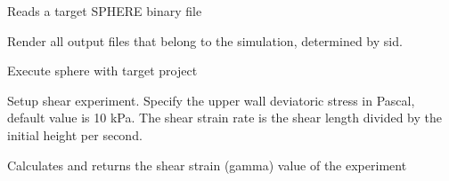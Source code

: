 \documentclass[letterpaper,10pt,english]{sphinxmanual}
\begin{document}
\begin{fulllineitems}

\begin{fulllineitems}
\label{python_api:sphere.Spherebin.readbin}
Reads a target SPHERE binary file

\end{fulllineitems}


\begin{fulllineitems}
\label{python_api:sphere.Spherebin.render}
Render all output files that belong to the simulation, determined by sid.

\end{fulllineitems}


\begin{fulllineitems}
\label{python_api:sphere.Spherebin.run}
Execute sphere with target project

\end{fulllineitems}


\begin{fulllineitems}
\label{python_api:sphere.Spherebin.shear}
Setup shear experiment. Specify the upper wall 
deviatoric stress in Pascal, default value is 10 kPa.
The shear strain rate is the shear length divided by the
initial height per second.

\end{fulllineitems}


\begin{fulllineitems}
\label{python_api:sphere.Spherebin.shearstrain}
Calculates and returns the shear strain (gamma) value of the experiment

\end{fulllineitems}


\end{fulllineitems}
\end{document}
